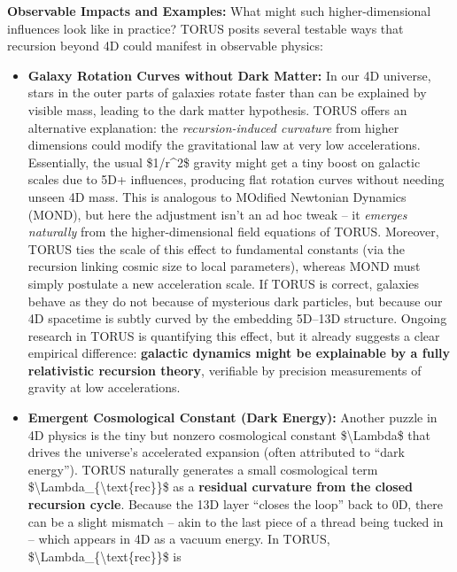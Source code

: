 \documentclass[
]{article}
\begin{document}
\textbf{Observable Impacts and Examples:} What might such
higher-dimensional influences look like in practice? TORUS posits
several testable ways that recursion beyond 4D could manifest in
observable physics:

\begin{itemize}
\item
  \textbf{Galaxy Rotation Curves without Dark Matter:} In our 4D
  universe, stars in the outer parts of galaxies rotate faster than can
  be explained by visible mass, leading to the dark matter hypothesis.
  TORUS offers an alternative explanation: the \emph{recursion-induced
  curvature} from higher dimensions could modify the gravitational law
  at very low accelerations\hspace{0pt}. Essentially, the usual
  \$1/r\^{}2\$ gravity might get a tiny boost on galactic scales due to
  5D+ influences, producing flat rotation curves without needing unseen
  4D mass. This is analogous to MOdified Newtonian Dynamics (MOND), but
  here the adjustment isn't an ad hoc tweak -- it \emph{emerges
  naturally} from the higher-dimensional field equations of
  TORUS\hspace{0pt}. Moreover, TORUS ties the scale of this effect to
  fundamental constants (via the recursion linking cosmic size to local
  parameters), whereas MOND must simply postulate a new acceleration
  scale. If TORUS is correct, galaxies behave as they do not because of
  mysterious dark particles, but because our 4D spacetime is subtly
  curved by the embedding 5D--13D structure. Ongoing research in TORUS
  is quantifying this effect, but it already suggests a clear empirical
  difference: \textbf{galactic dynamics might be explainable by a fully
  relativistic recursion theory}, verifiable by precision measurements
  of gravity at low accelerations.
\item
  \textbf{Emergent Cosmological Constant (Dark Energy):} Another puzzle
  in 4D physics is the tiny but nonzero cosmological constant
  \$\textbackslash Lambda\$ that drives the universe's accelerated
  expansion (often attributed to ``dark energy''). TORUS naturally
  generates a small cosmological term
  \$\textbackslash Lambda\_\{\textbackslash text\{rec\}\}\$ as a
  \textbf{residual curvature from the closed recursion
  cycle}\hspace{0pt}. Because the 13D layer ``closes the loop'' back to
  0D, there can be a slight mismatch -- akin to the last piece of a
  thread being tucked in -- which appears in 4D as a vacuum energy. In
  TORUS, \$\textbackslash Lambda\_\{\textbackslash text\{rec\}\}\$ is

\end{itemize}
\end{document}
